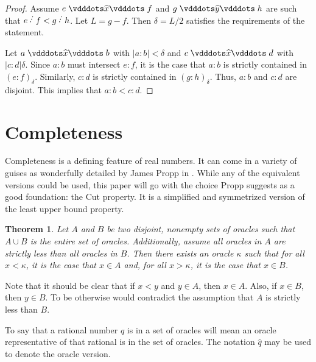 \documentclass[12pt]{article}
\newtheorem{theorem}{Theorem}[section]
\begin{document}
\begin{proof}
    Assume $e \xora f$ and $g \xora[y] h$ are such that $e\lte f < g \lte h$. Let $L = g-f$. Then $\delta = L/2$ satisfies the requirements of the statement. 

    Let $a \xora b$ with $|a:b| < \delta$ and $c \xora d$ with $|c:d| \delta$. Since $a:b$ must intersect $e:f$, it is the case that $a:b$ is strictly contained in $(e:f)_\delta$. Similarly, $c:d$ is strictly contained in $(g:h)_\delta$. Thus, $a:b$ and $c:d$ are disjoint. This implies that $a:b < c:d$. 
\end{proof}


\section{Completeness}

Completeness is a defining feature of real numbers. It can come in a variety of guises as wonderfully detailed by James Propp in \cite{propp}. While any of the equivalent versions could be used, this paper will go with the choice Propp suggests as a good foundation: the Cut property. It is a simplified and symmetrized version of the least upper bound property. 

\begin{theorem}\label{os:cut}
    Let $A$ and $B$ be two disjoint, nonempty sets of oracles such that $A \cup B$ is the entire set of oracles.  Additionally, assume all oracles in $A$ are strictly less than all oracles in $B$. Then there exists an oracle $\kappa$ such that for all $x < \kappa$, it is the case that $x \in A$ and, for all $x > \kappa$, it is the case that $x \in B$.
\end{theorem}

Note that it should be clear that if $x < y$ and $y \in A$, then $x  \in A$. Also, if $x \in B$, then $y \in B$. To be otherwise would contradict the assumption that $A$ is strictly less than $B$. 

To say that a rational number $q$ is in a set of oracles will mean an oracle representative of that rational is in the set of oracles. The notation $\widehat{q}$ may be used to denote the oracle version.
\end{document}
